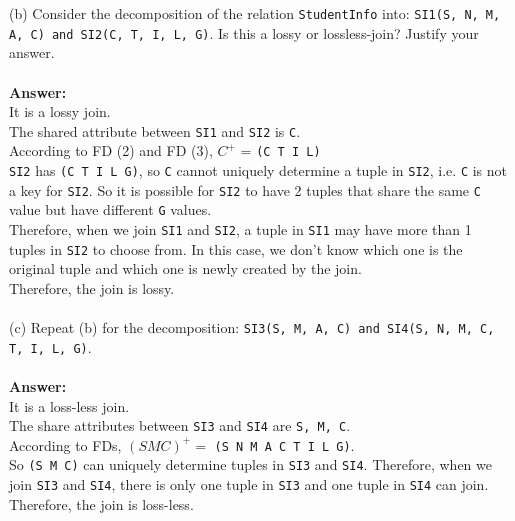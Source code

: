 \documentclass{article}
\begin{document}
\noindent (b) Consider the decomposition of the relation \texttt{StudentInfo} into: \texttt{SI1(S, N, M, A, C) and SI2(C, T, I, L, G)}. Is this a lossy or lossless-join? Justify your answer.\\
\\
\textbf{Answer:}\\
It is a lossy join.\\
The shared attribute between \texttt{SI1} and \texttt{SI2} is \texttt{C}. \\
According to FD (2) and FD (3), \(C^{+}\) = \texttt{(C T I L)} \\
\texttt{SI2} has \texttt{(C T I L G)}, so \texttt{C} cannot uniquely determine a tuple in \texttt{SI2}, i.e. \texttt{C} is not a key for \texttt{SI2}. So it is possible for \texttt{SI2} to have 2 tuples that share the same \texttt{C} value but have different \texttt{G} values.\\
Therefore, when we join \texttt{SI1} and \texttt{SI2}, a tuple in \texttt{SI1} may have more than 1 tuples in \texttt{SI2} to choose from. In this case, we don't know which one is the original tuple and which one is newly created by the join.\\
Therefore, the join is lossy.\\
\\
\noindent (c) Repeat (b) for the decomposition: \texttt{SI3(S, M, A, C) and SI4(S, N, M, C, T, I, L, G)}. \\
\\
\textbf{Answer:}\\
It is a loss-less join.\\
The share attributes between \texttt{SI3} and \texttt{SI4} are \texttt{S, M, C}.\\
According to FDs, \( (S M C)^+ = \) \texttt{(S N M A C T I L G)}. \\
So \texttt{(S M C)} can uniquely determine tuples in \texttt{SI3} and \texttt{SI4}. Therefore, when we join \texttt{SI3} and \texttt{SI4}, there is only one tuple in \texttt{SI3} and one tuple in \texttt{SI4} can join. Therefore, the join is loss-less.
\end{document}
